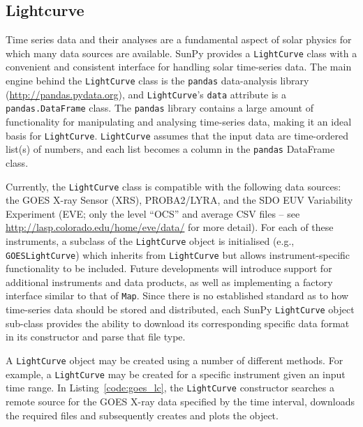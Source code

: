 \subsection{Lightcurve}\label{ssec:lightcurve}

Time series data and their analyses are a fundamental aspect of solar
physics for which many data sources are available.
SunPy provides a \texttt{LightCurve} class
with a convenient and consistent interface for handling solar time-series
data.  The main engine behind the \texttt{LightCurve} class is
the {\texttt{pandas}} data-analysis library (\url{http://pandas.pydata.org}), and 
\texttt{LightCurve}'s \texttt{data} attribute is a \texttt{pandas.DataFrame} 
class.
The \texttt{pandas} library contains a large amount
of functionality for manipulating and analysing time-series data,
making it an ideal basis for \texttt{LightCurve}.  \texttt{LightCurve}
assumes that the input data are time-ordered list(s) of numbers, and each
list becomes a column in the \texttt{pandas} DataFrame class.

Currently, the \texttt{LightCurve} class is compatible with the
following data sources: the GOES X-ray Sensor (XRS), PROBA2/LYRA, and
the SDO EUV Variability Experiment (EVE; only the level ``OCS'' and
average CSV files -- see \url{http://lasp.colorado.edu/home/eve/data/}
for more detail).  For each of these instruments, a subclass of the
\texttt{LightCurve} object is initialised
(e.g., \texttt{GOESLightCurve}) which inherits from
\texttt{LightCurve} but allows instrument-specific functionality to be
included.  Future developments will introduce support for additional
instruments and data products, as well as implementing a factory interface 
similar to that of \texttt{Map}.  Since there is no established standard
as to how time-series data should be stored and distributed, each SunPy 
\texttt{LightCurve} object sub-class provides the ability to download its corresponding 
specific data format in its constructor and parse that file type.

A \texttt{LightCurve} object may be created using a number of different methods. 
For example, a \texttt{LightCurve} may be created for a specific instrument given
an input time range. In Listing~\ref{code:goes_lc}, 
the \texttt{LightCurve} constructor searches a remote source for the GOES X-ray 
data specified by the time interval, downloads the required files and 
subsequently creates and plots the object.

